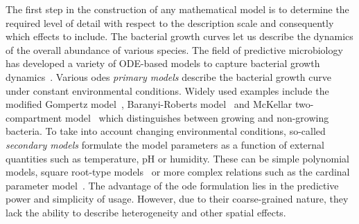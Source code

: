 \documentclass[10pt,A4paper]{article}
\numberwithin{equation}{section}
\begin{document}

The first step in the construction of any mathematical model is to determine the required level of
detail with respect to the description scale and consequently which effects to include.
The bacterial growth curves let us describe the dynamics of the overall abundance of various
species.
The field of predictive microbiology has developed a variety of ODE-based models to capture
bacterial growth dynamics~\cite{perez-rodriguez_predictive_2012}.
Various \acp{ode} \textit{primary models} describe the bacterial growth curve under constant
environmental conditions.
Widely used examples include the modified Gompertz model~\cite{Gompertz1825-wi,Gibson1987}, Baranyi-Roberts
model~\cite{baranyi_modeling_1993, baranyi_dynamic_1994} and McKellar two-compartment model~\cite{buchanan_when_1997} which distinguishes between growing and non-growing bacteria.
To take into account changing environmental conditions, so-called \textit{secondary models}
formulate the model parameters as a function of external quantities such as temperature, pH or
humidity.
These can be simple polynomial models, square root-type models~\cite{ratkowsky_relationship_1982} or
more complex relations such as the cardinal parameter model~\cite{zwietering_decision_1992}.
The advantage of the \ac{ode} formulation lies in the predictive power and simplicity of usage.
However, due to their coarse-grained nature, they lack the ability to describe heterogeneity and
other spatial effects.
\end{document}
